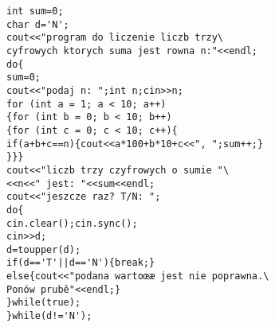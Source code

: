 \begin{verbatim}
int sum=0;
char d='N';
cout<<"program do liczenie liczb trzy\
cyfrowych ktorych suma jest rowna n:"<<endl;
do{
sum=0;
cout<<"podaj n: ";int n;cin>>n;
for (int a = 1; a < 10; a++)
{for (int b = 0; b < 10; b++)
{for (int c = 0; c < 10; c++){
if(a+b+c==n){cout<<a*100+b*10+c<<", ";sum++;}
}}}
cout<<"liczb trzy czyfrowych o sumie "\
<<n<<" jest: "<<sum<<endl;
cout<<"jeszcze raz? T/N: ";
do{
cin.clear();cin.sync();
cin>>d;
d=toupper(d);
if(d=='T'||d=='N'){break;}
else{cout<<"podana wartoœæ jest nie poprawna.\
Ponów prubê"<<endl;}
}while(true);
}while(d!='N');
\end{verbatim}